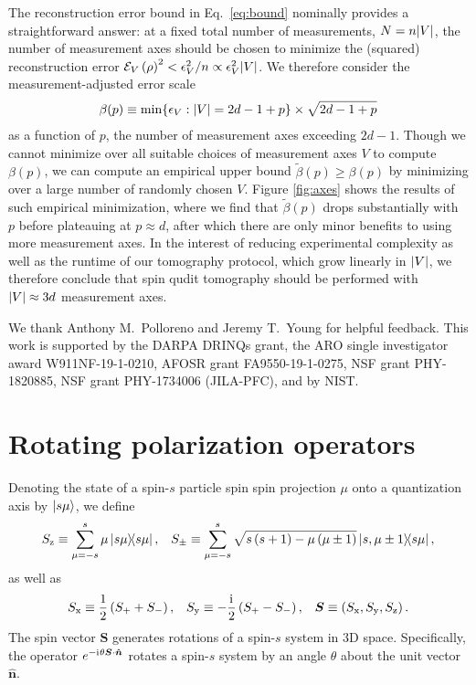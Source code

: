 \documentclass[a4paper,twocolumn,unpublished]{quantumarticle}
\newcommand{\f}[2]{\dfrac{#1}{#2}} %
\newcommand{\p}[1]{\left(#1\right)} %
\newcommand{\uv}[1]{\bm{\hat{#1}}} %
\renewcommand{\i}{\mathrm{i}\mkern1mu} %
\renewcommand{\set}[1]{\{#1\}} %
\newcommand{\x}{\text{x}}
\newcommand{\y}{\text{y}}
\newcommand{\z}{\text{z}}
\newcommand{\E}{\mathcal{E}}
\begin{document}
The reconstruction error bound in Eq.~\eqref{eq:bound} nominally provides a straightforward answer: at a fixed total number of measurements, $N=n\abs{V}$, the number of measurement axes should be chosen to minimize the (squared) reconstruction error $\E_V\p{\rho}^2<\epsilon_V^2/n\propto\epsilon_V^2\abs{V}$.
We therefore consider the measurement-adjusted error scale
\begin{align}
  \beta(p)
  \equiv \min\set{\epsilon_V:\abs{V}=2d-1+p} \times \sqrt{2d-1+p}
\end{align}
as a function of $p$, the number of measurement axes exceeding $2d-1$.
Though we cannot minimize over all suitable choices of measurement axes $V$ to compute $\beta(p)$, we can compute an empirical upper bound $\tilde\beta(p)\ge\beta(p)$ by minimizing over a large number of randomly chosen $V$.
Figure \ref{fig:axes} shows the results of such empirical minimization, where we find that $\tilde\beta(p)$ drops substantially with $p$ before plateauing at $p\approx d$, after which there are only minor benefits to using more measurement axes.
In the interest of reducing experimental complexity as well as the runtime of our tomography protocol, which grow linearly in $\abs{V}$, we therefore conclude that spin qudit tomography should be performed with $\abs{V}\approx3d$ measurement axes.


\begin{acknowledgments}
We thank Anthony M.~Polloreno and Jeremy T.~Young for helpful feedback.
This work is supported  by the DARPA DRINQs grant, the ARO single investigator award W911NF-19-1-0210, AFOSR grant FA9550-19-1-0275, NSF grant PHY-1820885, NSF grant PHY-1734006 (JILA-PFC), and by NIST.
\end{acknowledgments}

\printbibliography
\onecolumn
\newpage
\appendix

\section{Rotating polarization operators}
\label{sec:rotations}

Denoting the state of a spin-$s$ particle spin spin projection $\mu$ onto a quantization axis by $\ket{s\mu}$, we define
\begin{align}
  S_\z \equiv \sum_{\mu=-s}^s \mu \op{s\mu},
  &&
  S_\pm \equiv \sum_{\mu=-s}^s
  \sqrt{s\p{s+1}-\mu\p{\mu\pm1}} \op{s,\mu\pm1}{s\mu},
  \label{eq:spin_ops}
\end{align}
as well as
\begin{align}
  S_\x \equiv \f12\p{S_+ + S_-},
  &&
  S_\y \equiv -\f\i2\p{S_+-S_-},
  &&
  \bm S \equiv \p{S_\x,S_\y,S_\z}.
\end{align}
The spin vector $\bm S$ generates rotations of a spin-$s$ system in 3D space.
Specifically, the operator $e^{-\i\theta\bm S\cdot\uv n}$ rotates a spin-$s$ system by an angle $\theta$ about the unit vector $\uv n$.
\end{document}
